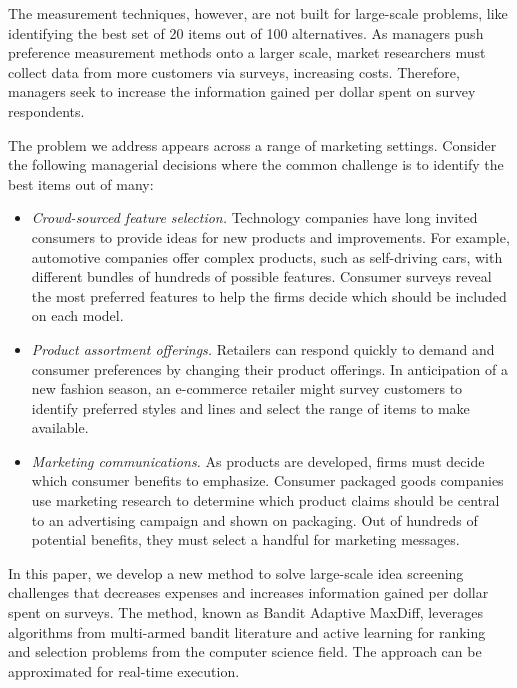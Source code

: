 \documentclass[a4paper,11pt]{article}
\begin{document}
The measurement techniques, however, are not built for large-scale problems, like identifying the best set of 20 items out of 100 alternatives. As managers push preference measurement methods onto a larger scale, market researchers must collect data from more customers via surveys, increasing costs. Therefore, managers seek to increase the information gained per dollar spent on survey respondents. 

The problem we address appears across a range of marketing settings. Consider the following managerial decisions where the common challenge is to identify the best items out of many:

\begin{itemize}
	\item \emph{Crowd-sourced feature selection.} Technology companies have long invited consumers to provide ideas for new products and improvements. For example, automotive companies offer complex products, such as self-driving cars, with different bundles of hundreds of possible features. Consumer surveys reveal the most preferred features to help the firms decide which should be included on each model.
	\item \emph{Product assortment offerings.} Retailers can respond quickly to demand and consumer preferences by changing their product offerings. In anticipation of a new fashion season, an e-commerce retailer might survey customers to identify preferred styles and lines and select the range of items to make available.
	\item \emph{Marketing communications.} As products are developed, firms must decide which consumer benefits to emphasize. Consumer packaged goods companies use marketing research to determine which product claims should be central to an advertising campaign and shown on packaging. Out of hundreds of potential benefits, they must select a handful for marketing messages.
\end{itemize}

In this paper, we develop a new method to solve large-scale idea screening challenges that decreases expenses and increases information gained per dollar spent on surveys. The method, known as Bandit Adaptive MaxDiff, leverages algorithms from multi-armed bandit literature and active learning for ranking and selection problems from the computer science field. The approach can be approximated for real-time execution.
\end{document}
